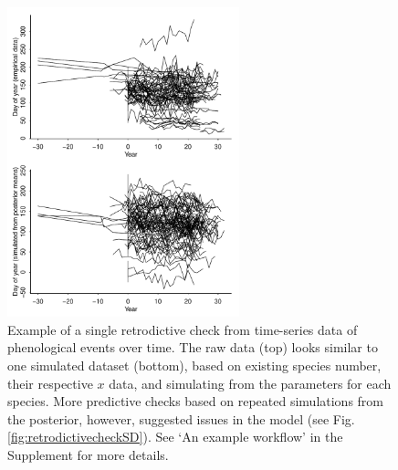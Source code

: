 \documentclass[11pt]{article}
\begin{document}
\begin{figure}[ht]
\centering
\noindent \includegraphics[width=0.6\textwidth]{examples/synchrony/graphs/rawvsonepredictivecheck.pdf}
\caption{Example of a single retrodictive check from time-series data of phenological events over time. The raw data (top) looks similar to one simulated dataset (bottom), based on existing species number, their respective $x$ data, and simulating from the parameters for each species. More predictive checks based on repeated simulations from the posterior, however, suggested issues in the model (see Fig. \ref{fig:retrodictivecheckSD}). See `An example workflow' in the Supplement for more details.}
\label{fig:retrodictivecheck}
\end{figure}
\end{document}
